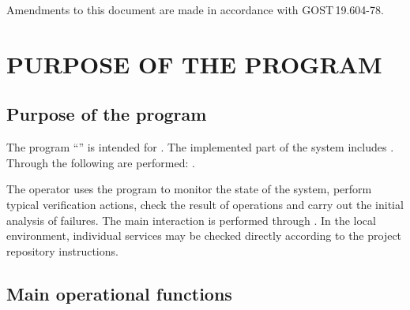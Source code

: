 \documentclass[12pt,a4paper]{extarticle}
\begin{document}
Amendments to this document are made in accordance with GOST\,19.604-78\cite{gost19604}.

\clearpage

\hypersetup{linkcolor=black}
\tableofcontents
\hypersetup{linkcolor=blue}
\thispagestyle{fancy}
\clearpage

\section{PURPOSE OF THE PROGRAM}

\subsection{Purpose of the program}

\begin{hseExample}
The program \enquote{\projectname} is intended for . The implemented part of the system includes . Through  the following are performed: .

The operator uses the program to monitor the state of the system, perform typical verification actions, check the result of operations and carry out the initial analysis of failures. The main interaction is performed through . In the local environment, individual services may be checked directly according to the project repository instructions.
\end{hseExample}

\subsection{Main operational functions}
\end{document}
